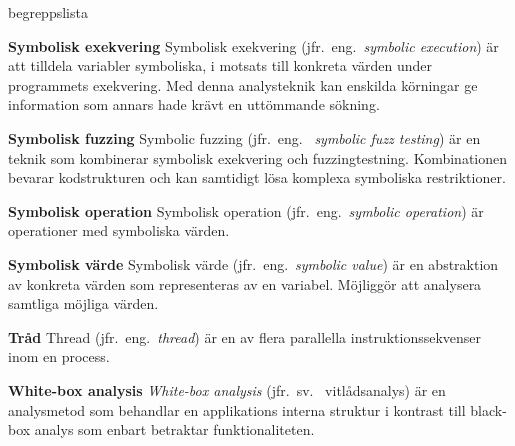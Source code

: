 \begin{labeling}{begreppslista}

    \item [\textbf{Symbolisk exekvering}] Symbolisk exekvering (jfr.\ eng.\
    \emph{symbolic execution}) är att tilldela variabler symboliska, i motsats
    till konkreta värden under programmets exekvering. Med denna analysteknik
    kan enskilda körningar ge information som annars hade krävt en uttömmande
    sökning.

    \item [\textbf{Symbolisk fuzzing}] Symbolic fuzzing (jfr.\ eng.
    \ \emph{symbolic fuzz testing}) är en teknik som kombinerar symbolisk
    exekvering och fuzzingtestning. Kombinationen bevarar kodstrukturen och kan
    samtidigt lösa komplexa symboliska restriktioner.

    \item [\textbf{Symbolisk operation}] Symbolisk operation (jfr.\ eng.\ \emph{symbolic
        operation}) är operationer med symboliska värden.

    \item [\textbf{Symbolisk värde}] Symbolisk värde (jfr.\ eng.\ \emph{symbolic
        value}) är en abstraktion av konkreta värden som representeras av en
    variabel. Möjliggör att analysera samtliga möjliga värden.

    \item [\textbf{Tråd}] Thread (jfr.\ eng.\ \emph{thread}) är en av flera
    parallella instruktionssekvenser inom en process.

    \item [\textbf{White-box analysis}] \emph{White-box analysis} (jfr.\ sv.
    \ vitlådsanalys) är en analysmetod som behandlar en applikations
    interna struktur i kontrast till black-box analys som enbart betraktar
    funktionaliteten.

\end{labeling}
